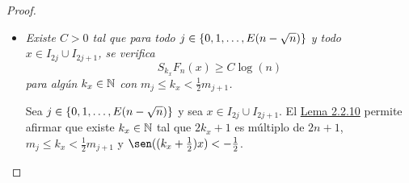 \documentclass[a4paper, 12pt, oneside]{book}
\begin{document}
\begin{proof}
\begin{itemize}
\begin{align*}
            S_{k}f_n(x) &\geq \frac{1}{2n}\sum_{i=j+1}^n \Bigl(\frac{m_i-k}{m_i+1}+2\sum_{m=1}^{k}\frac{m_i-k}{m_i+1}\cos(m(x-x_{2i}))\Bigr) \\
            &= \frac{1}{2n}\sum_{i=j+1}^n \frac{m_i-k}{m_i+1}\Bigl(1+2\sum_{m=1}^{k} \cos(m(x-x_{2i}))\Bigr) \\
            &= \frac{1}{2n}\sum_{i=j+1}^n \frac{m_i-k}{m_i+1}D_{k}(x-x_{2i}).
        \end{align*}
        Esto completa la prueba de \hyperref[2.2.16]{\color{blue}(2.2.16)}.
        \item \textit{Existe $C > 0$ tal que para todo $j \in \{0,1,\mathellipsis,E(n-\sqrt{n})\}$ y todo $x \in I_{2j}\cup I_{2j+1}$, se verifica
        \begin{equation}\label{2.2.17}
            S_{k_x}F_n(x) \geq C\log(n)
        \end{equation}
        para algún $k_x \in \mathbb N$ con $m_j \leq k_x < \frac{1}{2}m_{j+1}$.
        }

        Sea $j \in \{0,1,\mathellipsis,E(n-\sqrt{n})\}$ y sea $x \in I_{2j} \cup I_{2j+1}$. El \hyperref[2.2.10]{\color{blue}Lema 2.2.10} permite afirmar que existe $k_x \in \mathbb N$ tal que $2k_x+1$ es múltiplo de $2n+1$, $m_{j} \leq k_x < \frac{1}{2}m_{j+1}$ y $\sen((k_x+\frac{1}{2})x) < -\frac{1}{2}$.


\end{itemize}
\end{proof}
\end{document}
